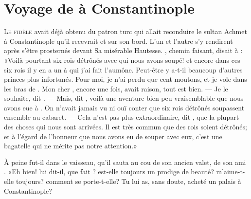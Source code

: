 \chapter{Voyage de  à Constantinople}


\lettrine{L}{e fidèle}  avait déjà obtenu du patron turc qui allait
reconduire le sultan Achmet à Constantinople qu’il recevrait  et
 sur son bord. L’un et l’autre s’y rendirent après s’être
prosternés devant Sa misérable Hautesse. , chemin faisant, disait
à : «Voilà pourtant six rois détrônés avec qui nous avons soupé!
et encore dans ces six rois il y en a un à qui j’ai fait l’aumône.
Peut-être y a-t-il beaucoup d’autres princes plus infortunés. Pour moi,
je n’ai perdu que cent moutons, et je vole dans les bras de .
Mon cher , encore une fois,  avait raison, tout est bien.
— Je le souhaite, dit . — Mais, dit , voilà une aventure bien
peu vraisemblable que nous avons eue à  . On n’avait jamais vu ni
ouï conter que six rois détrônés soupassent ensemble au cabaret. — Cela
n’est pas plus extraordinaire, dit , que la plupart des choses
qui nous sont arrivées. Il est très commun que des rois soient
détrônés; et à l’égard de l’honneur que nous avons eu de souper avec
eux, c’est une bagatelle qui ne mérite pas notre attention.»

À peine  fut-il dans le vaisseau, qu’il sauta au cou de son
ancien valet, de son ami . «Eh bien! lui dit-il, que fait
? est-elle toujours un prodige de beauté? m’aime-t-elle
toujours? comment se porte-t-elle? Tu lui as, sans doute, acheté un
palais à Constantinople?




